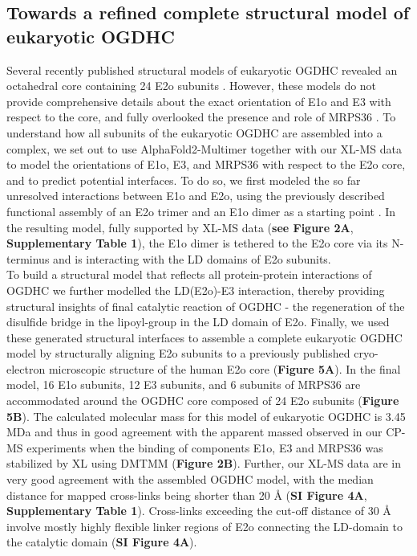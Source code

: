 \documentclass[times, twoside]{zHenriquesLab-StyleBioRxiv}
\begin{document}
\subsection*{Towards a refined complete structural model of eukaryotic OGDHC}
Several recently published structural models of eukaryotic OGDHC revealed an octahedral core containing 24 E2o subunits \cite{Lengyel_2008, Liu_2022, Nagy_2021}. However, these models do not provide comprehensive details about the exact orientation of E1o and E3 with respect to the core, and fully overlooked the presence and role of MRPS36 \cite{Lengyel_2008, Liu_2022, Nagy_2021}. To understand how all subunits of the eukaryotic OGDHC are assembled into a complex, we set out to use AlphaFold2-Multimer \cite{Evans_2022} together with our XL-MS data to model the orientations of E1o, E3, and MRPS36 with respect to the E2o core, and to predict potential interfaces. To do so, we first modeled the so far unresolved interactions between E1o and E2o, using the previously described functional assembly of an E2o trimer and an E1o dimer as a starting point \cite{Perham_1991, Perham_2000, Reed_1974}. In the resulting model, fully supported by XL-MS data (\textbf{see Figure 2A}, \textbf{Supplementary Table 1}), the E1o dimer is tethered to the E2o core via its N-terminus and is interacting with the LD domains of E2o subunits.\\ 
To build a structural model that reflects all protein-protein interactions of OGDHC we further modelled the LD(E2o)-E3 interaction, thereby providing structural insights of final catalytic reaction of OGDHC - the regeneration of the disulfide bridge in the lipoyl-group in the LD domain of E2o. Finally, we used these generated structural interfaces to assemble a complete eukaryotic OGDHC model by structurally aligning E2o subunits to a previously published cryo-electron microscopic structure of the human E2o core \cite{Nagy_2021} (\textbf{Figure 5A}). In the final model, 16 E1o subunits, 12 E3 subunits, and 6 subunits of MRPS36 are accommodated around the OGDHC core composed of 24 E2o subunits (\textbf{Figure 5B}). The calculated molecular mass for this model of eukaryotic OGDHC is 3.45 MDa and thus in good agreement with the apparent massed observed in our CP-MS experiments when the binding of components E1o, E3 and MRPS36 was stabilized by XL using DMTMM (\textbf{Figure 2B}). Further, our XL-MS data are in very good agreement with the assembled OGDHC model, with the median distance for mapped cross-links being shorter than 20 Å (\textbf{SI Figure 4A}, \textbf{Supplementary Table 1}). Cross-links exceeding the cut-off distance of 30 Å involve mostly highly flexible linker regions of E2o connecting the LD-domain to the catalytic domain (\textbf{SI Figure 4A}).\\
\end{document}
